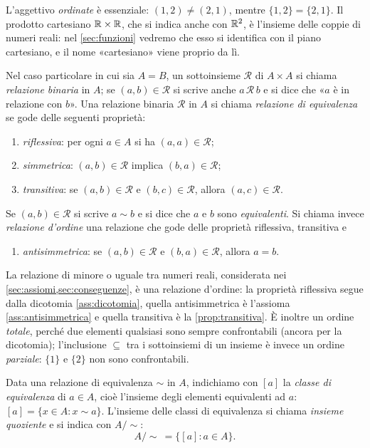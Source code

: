 L'aggettivo \emph{ordinate} è essenziale: $(1,2)\neq(2,1)$, mentre $\{1,2\}=\{2,1\}$.
Il prodotto cartesiano $\mathbb{R}\times\mathbb{R}$, che si indica anche con $\mathbb{R}^{2}$, è l'insieme delle
coppie di numeri reali: nel \cref{sec:funzioni} vedremo che esso si identifica con il
piano cartesiano, e il nome «cartesiano» viene proprio da lì.

\begin{definizione}
Nel caso particolare in cui sia $A=B$, un sottoinsieme $\mathcal{R}$ di $A\times A$ si
chiama \emph{relazione binaria} in $A$; se $(a,b)\in\mathcal{R}$ si scrive anche
$a\,\mathcal{R}\,b$ e si dice che «$a$ è in relazione con $b$». Una relazione binaria
$\mathcal{R}$ in $A$ si chiama \emph{relazione di equivalenza} se gode delle seguenti
proprietà:
\begin{enumerate}[label=\arabic*)]
  \item \emph{riflessiva}: per ogni $a\in A$ si ha $(a,a)\in\mathcal{R}$;
  \item \emph{simmetrica}: $(a,b)\in\mathcal{R}$ implica $(b,a)\in\mathcal{R}$;
  \item \emph{transitiva}: se $(a,b)\in\mathcal{R}$ e $(b,c)\in\mathcal{R}$, allora
  $(a,c)\in\mathcal{R}$.
\end{enumerate}
Se $(a,b)\in\mathcal{R}$ si scrive $a\sim b$ e si dice che $a$ e $b$ sono
\emph{equivalenti}. Si chiama invece \emph{relazione d'ordine} una relazione che gode
delle proprietà riflessiva, transitiva e
\begin{enumerate}[label=\arabic*'),start=2]
  \item \emph{antisimmetrica}: se $(a,b)\in\mathcal{R}$ e $(b,a)\in\mathcal{R}$, allora
  $a=b$.
\end{enumerate}
\end{definizione}

La relazione di minore o uguale tra numeri reali, considerata nei
\cref{sec:assiomi,sec:conseguenze}, è una relazione d'ordine: la proprietà
riflessiva segue dalla dicotomia \ref{ass:dicotomia}, quella antisimmetrica è l'assioma
\ref{ass:antisimmetrica} e quella transitiva è la \cref{prop:transitiva}. È inoltre un
ordine \emph{totale}, perché due elementi qualsiasi sono sempre confrontabili (ancora
per la dicotomia); l'inclusione $\subseteq$ tra i sottoinsiemi di un insieme è invece
un ordine \emph{parziale}: $\{1\}$ e $\{2\}$ non sono confrontabili.

\begin{definizione}
Data una relazione di equivalenza $\sim$ in $A$, indichiamo con $[a]$ la \emph{classe di
equivalenza} di $a\in A$, cioè l'insieme degli elementi equivalenti ad $a$:
$[a]=\{x\in A : x\sim a\}$. L'insieme delle classi di equivalenza si chiama
\emph{insieme quoziente} e si indica con $A/\!\sim$:
\[
  A/\!\sim\ = \{[a] : a\in A\}.
\]
\end{definizione}

